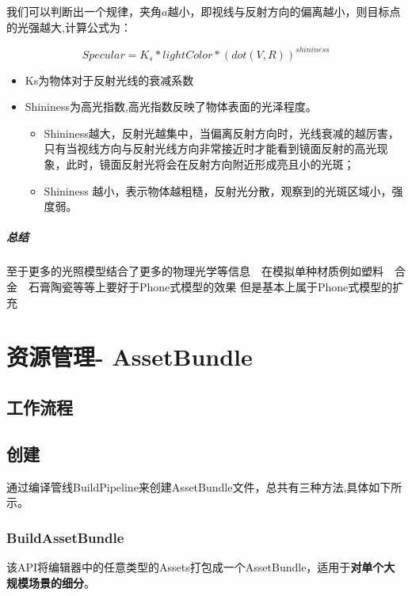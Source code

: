 \documentclass[UTF8,a4paper,12pt]{ctexbook}
\begin{document}
				我们可以判断出一个规律，夹角$a$越小，即视线与反射方向的偏离越小，则目标点的光强越大,计算公式为：
					
					$$Specular = K_s * lightColor * (dot(V,R))^{shininess}$$ 
				
					\begin{itemize}
						\item Ks为物体对于反射光线的衰减系数
						\item Shininess为高光指数,高光指数反映了物体表面的光泽程度。
						\begin{itemize}
							\item Shininess越大，反射光越集中，当偏离反射方向时，光线衰减的越厉害，只有当视线方向与反射光线方向非常接近时才能看到镜面反射的高光现象，此时，镜面反射光将会在反射方向附近形成亮且小的光斑；
							\item Shininess 越小，表示物体越粗糙，反射光分散，观察到的光斑区域小，强度弱。
						\end{itemize}
					\end{itemize}
			
			\paragraph{总结}
				至于更多的光照模型结合了更多的物理光学等信息　在模拟单种材质例如塑料　合金　石膏陶瓷等等上要好于Phone式模型的效果 但是基本上属于Phone式模型的扩充
\chapter{资源管理- AssetBundle}
	\section{工作流程}
	\section{创建}
		通过编译管线BuildPipeline来创建AssetBundle文件，总共有三种方法,具体如下所示。
		\subsection{BuildAssetBundle}
			该API将编辑器中的任意类型的Assets打包成一个AssetBundle，适用于\textbf{对单个大规模场景的细分}。
			
\end{document}
